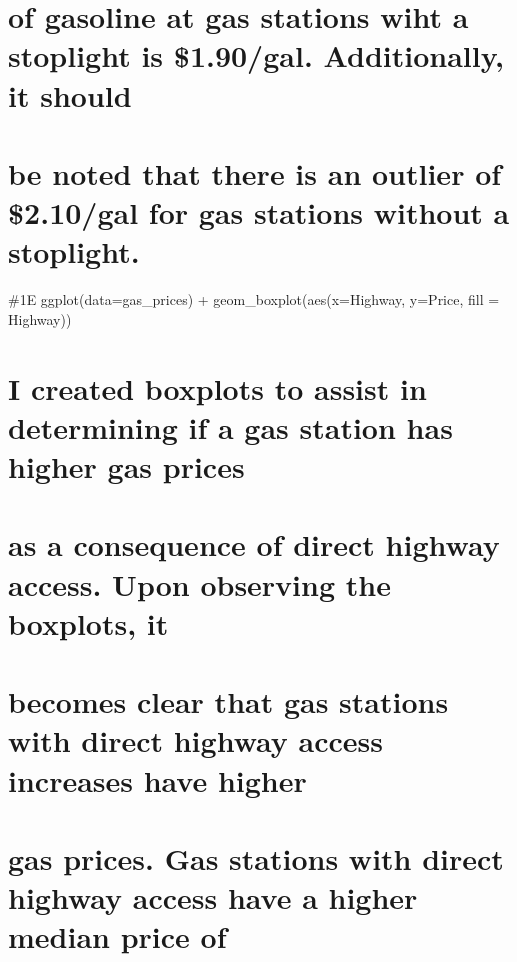 \documentclass[
]{article}
\begin{document}
\hypertarget{of-gasoline-at-gas-stations-wiht-a-stoplight-is-1.90gal.-additionally-it-should}{%
\section{of gasoline at gas stations wiht a stoplight is \$1.90/gal.
Additionally, it
should}\label{of-gasoline-at-gas-stations-wiht-a-stoplight-is-1.90gal.-additionally-it-should}}

\hypertarget{be-noted-that-there-is-an-outlier-of-2.10gal-for-gas-stations-without-a-stoplight.}{%
\section{be noted that there is an outlier of \$2.10/gal for gas
stations without a
stoplight.}\label{be-noted-that-there-is-an-outlier-of-2.10gal-for-gas-stations-without-a-stoplight.}}

\#1E ggplot(data=gas\_prices) + geom\_boxplot(aes(x=Highway, y=Price,
fill = Highway))

\hypertarget{i-created-boxplots-to-assist-in-determining-if-a-gas-station-has-higher-gas-prices}{%
\section{I created boxplots to assist in determining if a gas station
has higher gas
prices}\label{i-created-boxplots-to-assist-in-determining-if-a-gas-station-has-higher-gas-prices}}

\hypertarget{as-a-consequence-of-direct-highway-access.-upon-observing-the-boxplots-it}{%
\section{as a consequence of direct highway access. Upon observing the
boxplots,
it}\label{as-a-consequence-of-direct-highway-access.-upon-observing-the-boxplots-it}}

\hypertarget{becomes-clear-that-gas-stations-with-direct-highway-access-increases-have-higher}{%
\section{becomes clear that gas stations with direct highway access
increases have
higher}\label{becomes-clear-that-gas-stations-with-direct-highway-access-increases-have-higher}}

\hypertarget{gas-prices.-gas-stations-with-direct-highway-access-have-a-higher-median-price-of}{%
\section{gas prices. Gas stations with direct highway access have a
higher median price
of}\label{gas-prices.-gas-stations-with-direct-highway-access-have-a-higher-median-price-of}}
\end{document}
